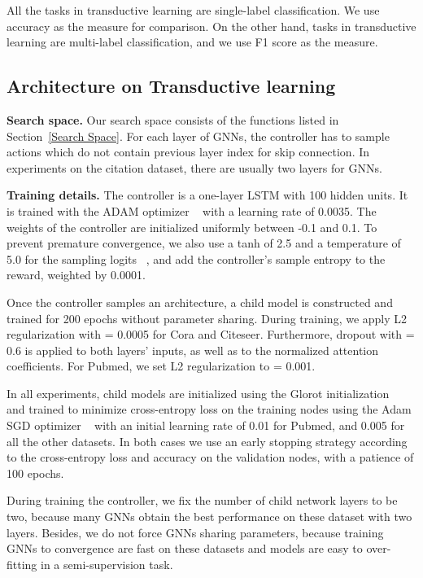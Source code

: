 \documentclass{article}
\begin{document}
All the tasks in transductive learning are single-label classification. We use accuracy as the measure for comparison. On the other hand, tasks in transductive learning are multi-label classification, and we use F1 score as the measure.

\subsection{Architecture on Transductive learning}


\textbf{Search space.} Our search space consists of the functions listed in Section~\ref{Search Space}. For each layer of GNNs, the controller  has to sample actions  which do not contain previous layer index  for skip connection. In experiments on the citation dataset, there are usually two layers for GNNs. 

\textbf{Training details.} The controller is a one-layer LSTM with 100 hidden units. It is trained with the ADAM optimizer ~\cite{Kingma2015AdamAM} with a learning rate of 0.0035. The weights of the controller are initialized uniformly between -0.1 and 0.1. To prevent premature convergence, we also use a tanh of 2.5 and a temperature of 5.0 for the sampling logits ~\cite{Bello2017NeuralOS,Bello2016NeuralCO},
and add the controller’s sample entropy to the reward, weighted by 0.0001. 

Once the controller samples an architecture, a child model is constructed and trained for 200 epochs without parameter sharing. During training, we apply L2 regularization with   = 0.0005 for Cora and Citeseer. Furthermore, dropout with  = 0.6 is applied to both layers’ inputs, as well as to the normalized attention coefficients. For Pubmed, we set L2 regularization to   = 0.001. 

In all experiments, child models are initialized using the Glorot initialization ~\cite{Glorot2010UnderstandingTD} and trained to minimize cross-entropy loss on the training nodes using the Adam SGD optimizer ~\cite{Kingma2015AdamAM} with an initial learning rate of 0.01 for Pubmed, and 0.005 for all the other datasets. In both cases we use an early stopping strategy according to  the cross-entropy loss and accuracy on the validation nodes, with a patience of 100 epochs.

During training the controller, we fix the number of child network layers to be two, because many GNNs obtain the best performance on these dataset with two layers. 
Besides, we do not force GNNs sharing parameters, because training GNNs to convergence are fast on these datasets and models are easy to over-fitting in a semi-supervision task.
\end{document}
